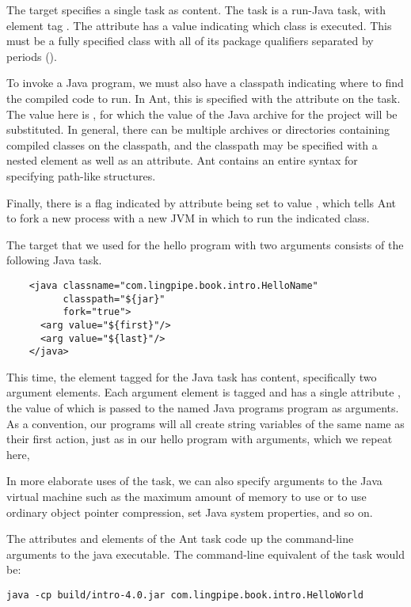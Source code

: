 The  target specifies a single task as content.  The task
is a run-Java task, with element tag .  The attribute
 has a value indicating which class is executed.  This
must be a fully specified class with all of its package qualifiers
separated by periods ().  

To invoke a Java program, we must also have a classpath indicating where
to find the compiled code to run.  In Ant, this is specified with
the  attribute on the  task.  The value here
is , for which the value of the Java archive for the
project will be substituted.  In general, there can be multiple archives
or directories containing compiled classes on the classpath, and the
classpath may be specified with a nested element as well as an attribute.
Ant contains an entire syntax for specifying path-like structures.

Finally, there is a flag indicated by attribute  being
set to value , which tells Ant to fork a new process with
a new JVM in which to run the indicated class.  

The target  that we used for the hello program with
two arguments consists of the following Java task.
%
\begin{verbatim}
    <java classname="com.lingpipe.book.intro.HelloName"
          classpath="${jar}"
          fork="true">
      <arg value="${first}"/>
      <arg value="${last}"/>
    </java>
\end{verbatim}
%
This time, the element tagged  for the Java task has
content, specifically two argument elements.  Each argument element is
tagged  and has a single attribute , the value
of which is passed to the named Java programs  program as
arguments.  As a convention, our programs will all create string
variables of the same name as their first action, just as in our
hello program with arguments, which we repeat here,
%

In more elaborate uses of the  task, we can also specify
arguments to the Java virtual machine such as the maximum amount of
memory to use or to use ordinary object pointer compression, set Java
system properties, and so on.

The attributes and elements of the Ant  task code up the
command-line arguments to the java executable.
The command-line equivalent of the  task would be:
%
\begin{verbatim} 
java -cp build/intro-4.0.jar com.lingpipe.book.intro.HelloWorld
\end{verbatim}
%

